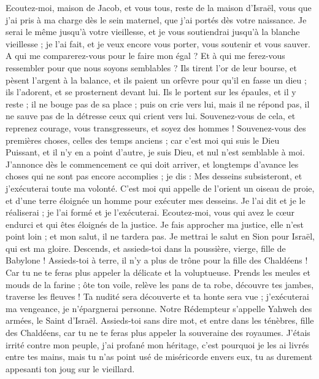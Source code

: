 \begin{multicols}{2}
{Ecoutez-moi, maison de Jacob, et vous tous, reste de la maison d'Israël, vous que j’ai pris à ma charge dès le sein maternel, que j’ai portés dès votre naissance.
Je serai le même jusqu’à votre vieillesse, et je vous soutiendrai jusqu’à la blanche vieillesse ; je l'ai fait, et je veux encore vous porter, vous soutenir et vous sauver.
A qui me comparerez-vous pour le faire mon égal ? Et à qui me ferez-vous ressembler pour que nous soyons semblables ?
Ils tirent l'or de leur bourse, et pèsent l'argent à la balance, et ils paient un orfèvre pour qu’il en fasse un dieu ; ils l'adorent, et se prosternent devant lui.
Ils le portent sur les épaules, et il y reste ; il ne bouge pas de sa place ; puis on crie vers lui, mais il ne répond pas, il ne sauve pas de la détresse ceux qui crient vers lui.
Souvenez-vous de cela, et reprenez courage, vous transgresseurs, et soyez des hommes !
Souvenez-vous des premières choses, celles des temps anciens ; car c'est moi qui suis le Dieu Puissant, et il n'y en a point d'autre, je suis Dieu, et nul n’est semblable à moi.
J’annonce dès le commencement ce qui doit arriver, et longtemps d’avance les choses qui ne sont pas encore accomplies ; je dis : Mes desseins subsisteront, et j’exécuterai toute ma volonté.
C’est moi qui appelle de l’orient un oiseau de proie, et d'une terre éloignée un homme pour exécuter mes desseins. Je l’ai dit et je le réaliserai ; je l’ai formé et je l’exécuterai.
Ecoutez-moi, vous qui avez le cœur endurci et qui êtes éloignés de la justice.
Je fais approcher ma justice, elle n’est point loin ; et mon salut, il ne tardera pas. Je mettrai le salut en Sion pour Israël, qui est ma gloire.
\VerseOne{}Descends, et assieds-toi dans la poussière, vierge, fille de Babylone ! Assieds-toi à terre, il n'y a plus de trône pour la fille des Chaldéens ! Car tu ne te feras plus appeler la délicate et la voluptueuse.
Prends les meules et mouds de la farine ; ôte ton voile, relève les pans de ta robe, découvre tes jambes, traverse les fleuves !
Ta nudité sera découverte et ta honte sera vue ; j’exécuterai ma vengeance, je n’épargnerai personne.
Notre Rédempteur s’appelle Yahweh des armées, le Saint d'Israël.
Assieds-toi sans dire mot, et entre dans les ténèbres, fille des Chaldéens, car tu ne te feras plus appeler la souveraine des royaumes.
J’étais irrité contre mon peuple, j'ai profané mon héritage, c'est pourquoi je les ai livrés entre tes mains, mais tu n'as point usé de miséricorde envers eux, tu as durement appesanti ton joug sur le vieillard.
}
\end{multicols}
